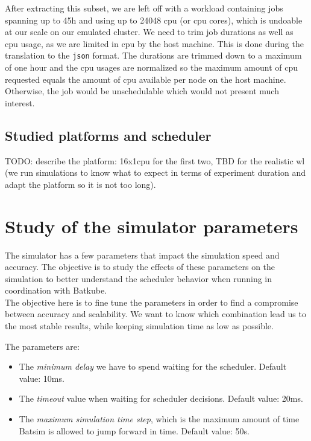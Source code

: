 \documentclass[12pt, a4paper]{memoir}
\begin{document}
After extracting this subset, we are left off with a workload containing jobs
spanning up to 45h and using up to 24048 cpu (or cpu cores), which is undoable
at our scale on our emulated cluster. We need to trim job durations as well as
cpu usage, as we are limited in cpu by the host machine. This is done during
the translation to the \texttt{json} format. The durations are trimmed down to
a maximum of one hour and the cpu usages are normalized so the maximum amount
of cpu requested equals the amount of cpu available per node on the host
machine. Otherwise, the job would be unschedulable which would not present much
interest.

\subsection{Studied platforms and scheduler}

TODO: describe the platform: 16x1cpu for the first two, TBD for the realistic
wl (we run simulations to know what to expect in terms of experiment duration
and adapt the platform so it is not too long).\\


\section{Study of the simulator parameters}

The simulator has a few parameters that impact the simulation speed and
accuracy. The objective is to study the effects of these parameters on the
simulation to better understand the scheduler behavior when running in
coordination with Batkube.\\

The objective here is to fine tune the parameters in order to find a compromise
between accuracy and scalability. We want to know which combination lead us to
the most stable results, while keeping simulation time as low as possible.

The parameters are:
\begin{itemize}
	\item The \textit{minimum delay} we have to spend waiting for the
		scheduler. Default value: 10ms.
	\item The \textit{timeout} value when waiting for scheduler decisions.
		Default value: 20ms.
	\item The \textit{maximum simulation time step}, which is the maximum
		amount of time Batsim is allowed to jump forward in time.
		Default value: 50s.
\end{itemize}
\end{document}
